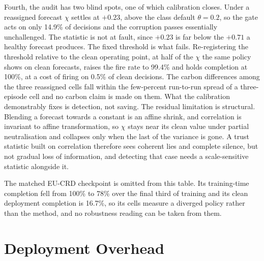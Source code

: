 \documentclass{article} %
\begin{document}
Fourth, the audit has two blind spots, one of which calibration closes. Under a reassigned forecast $\chi$ settles at $+0.23$, above the class default $\theta{=}0.2$, so the gate acts on only 14.9\% of decisions and the corruption passes essentially unchallenged. The statistic is not at fault, since $+0.23$ is far below the $+0.71$ a healthy forecast produces. The fixed threshold is what fails. Re-registering the threshold relative to the clean operating point, at half of the $\chi$ the same policy shows on clean forecasts, raises the fire rate to 99.4\% and holds completion at 100\%, at a cost of firing on 0.5\% of clean decisions. The carbon differences among the three reassigned cells fall within the few-percent run-to-run spread of a three-episode cell and no carbon claim is made on them. What the calibration demonstrably fixes is detection, not saving. The residual limitation is structural. Blending a forecast towards a constant is an affine shrink, and correlation is invariant to affine transformation, so $\chi$ stays near its clean value under partial neutralisation and collapses only when the last of the variance is gone. A trust statistic built on correlation therefore sees coherent lies and complete silence, but not gradual loss of information, and detecting that case needs a scale-sensitive statistic alongside it.

The matched EU-CRD checkpoint is omitted from this table. Its training-time completion fell from 100\% to 78\% over the final third of training and its clean deployment completion is 16.7\%, so its cells measure a diverged policy rather than the method, and no robustness reading can be taken from them.

\section{Deployment Overhead}
\label{app:overhead}
\end{document}
